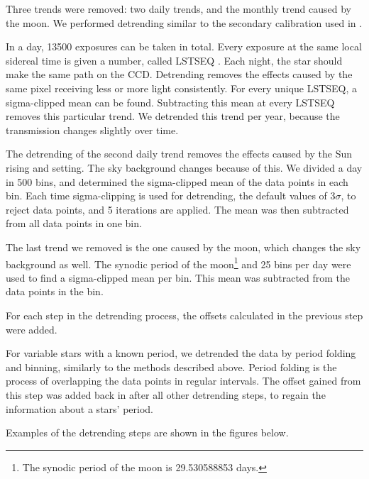 \documentclass{aa}
\begin{document}
Three trends were removed: two daily trends, and the monthly trend caused by the moon. We performed detrending similar to the secondary calibration used in \cite{Talens_2018}.

In a day, 13500 exposures can be taken in total. Every exposure at the same local sidereal time is given a number, called LSTSEQ \citep{Talens_2018}. Each night, the star should make the same path on the CCD. Detrending removes the effects caused by the same pixel receiving less or more light consistently. For every unique LSTSEQ, a sigma-clipped mean can be found. Subtracting this mean at every LSTSEQ removes this particular trend. We detrended this trend per year, because the transmission changes slightly over time.


The detrending of the second daily trend removes the effects caused by the Sun rising and setting. The sky background changes because of this. We divided a day in 500 bins, and determined the sigma-clipped mean of the data points in each bin. Each time sigma-clipping is used for detrending, the default values of 3$\sigma$, to reject data points, and 5 iterations are applied. The mean was then subtracted from all data points in one bin.

The last trend we removed is the one caused by the moon, which changes the sky background as well. The synodic period of the moon\footnote{The synodic period of the moon is 29.530588853 days.} and 25 bins per day were used to find a sigma-clipped mean per bin. This mean was subtracted from the data points in the bin. 

For each step in the detrending process, the offsets calculated in the previous step were added.

For variable stars with a known period, we detrended the data by period folding and binning, similarly to the methods described above. Period folding is the process of overlapping the data points in regular intervals. The offset gained from this step was added back in after all other detrending steps, to regain the information about a stars' period.

Examples of the detrending steps are shown in the figures below.
\end{document}
